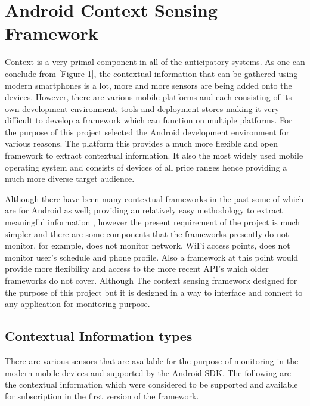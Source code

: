 \documentclass[12pt]{report}
\begin{document}
\chapter{Android Context Sensing Framework}
\label{ContextSensingFramework}
Context is a very primal component in all of the anticipatory systems. As one can conclude from [Figure 1], the contextual information that can be gathered using modern smartphones is a lot, more and more sensors are being added onto the devices. However, there are various mobile platforms and each consisting of its own development environment, tools and deployment stores making it very difficult to develop a framework which can function on multiple platforms. For the purpose of this project selected the Android development environment for various reasons.  The platform this provides a much more flexible and open framework to extract contextual information. It also the most widely used mobile operating system and consists of devices of all price ranges hence providing a much more diverse target audience.

Although there have been many contextual frameworks in the past some of which are for Android as well; providing an relatively easy methodology to extract meaningful information \cite{novakextensible2013, rachuri2010emotionsense}, however the present requirement of the project is much simpler and there are some components that the frameworks presently do not monitor, for example, \cite{novakextensible2013} does not monitor network, WiFi access points, \cite{rachuri2010emotionsense} does not monitor user's schedule and phone profile. Also a framework at this point would provide more flexibility and access to the more recent API's which older frameworks do not cover. Although The context sensing framework designed for the purpose of this project but it is designed in a way to interface and connect to any application for monitoring purpose.

\section{Contextual Information types}
\label{contextType}
There are various sensors that are available for the purpose of monitoring in the modern mobile devices and supported by the Android SDK. The following are the contextual information which were considered to be supported and available for subscription in the first version of the framework.
\end{document}

